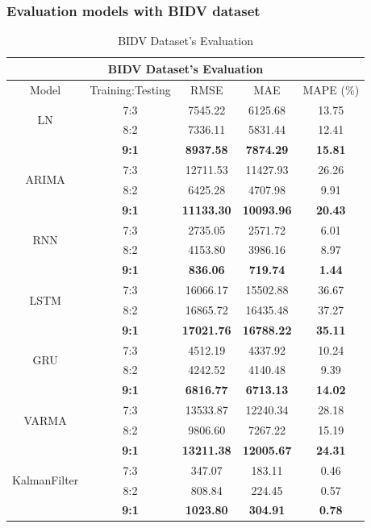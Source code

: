 \subsubsection{Evaluation models with BIDV dataset}
\begin{table}[H]
    \centering
    \caption{BIDV Dataset's Evaluation}
    \begin{tabular}{|c|c|c|c|c|}
         \hline
         \multicolumn{5}{|c|}{\textbf{BIDV Dataset's Evaluation}}\\
         \hline
         \centering Model & Training:Testing & RMSE & MAE & MAPE (\%)\\
         \hline
         \multirow{2}{*}{LN} & 7:3 & 7545.22&6125.68&13.75 \\ & 8:2 & 7336.11&5831.44&12.41 \\ & \textbf{9:1} & \textbf{8937.58} & \textbf{7874.29} & \textbf{15.81}\\
         \hline
         \multirow{2}{*}{ARIMA} & 7:3 & 12711.53&11427.93&26.26\\ & 8:2 & 6425.28&4707.98&9.91 \\ & \textbf{9:1} & \textbf{11133.30} & \textbf{10093.96} & \textbf{20.43}\\
         \hline
         \multirow{2}{*}{RNN} & 7:3 & 2735.05&2571.72&6.01\\ & 8:2 & 4153.80&3986.16&8.97 \\ & \textbf{9:1} & \textbf{836.06} & \textbf{719.74} & \textbf{1.44}\\
         \hline
         \multirow{2}{*}{LSTM} & 7:3 & 16066.17&15502.88&36.67\\ & 8:2 & 16865.72&16435.48&37.27 \\ & \textbf{9:1} & \textbf{17021.76} & \textbf{16788.22} & \textbf{35.11}\\
         \hline
         \multirow{2}{*}{GRU} & 7:3 & 4512.19&4337.92&10.24\\ & 8:2 & 4242.52&4140.48&9.39 \\ & \textbf{9:1} & \textbf{6816.77} & \textbf{6713.13} & \textbf{14.02}\\
         \hline
         \multirow{2}{*}{VARMA} & 7:3 & 13533.87&12240.34&28.18\\ & 8:2 & 9806.60&7267.22&15.19 \\ & \textbf{9:1} & \textbf{13211.38} & \textbf{12005.67} & \textbf{24.31}\\       
         \hline
         \multirow{2}{*}{KalmanFilter} & 7:3 & 347.07&183.11& 0.46\\ & 8:2 & 808.84&224.45&0.57 \\ & \textbf{9:1} & \textbf{1023.80} & \textbf{304.91} & \textbf{0.78}\\

\end{tabular}
\end{table}
